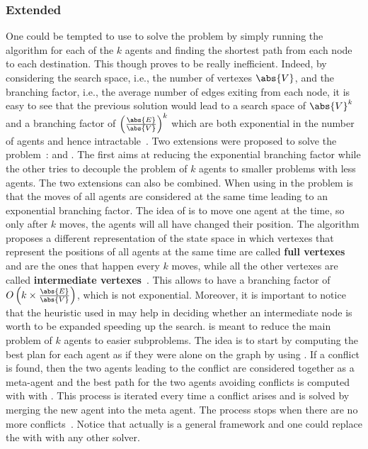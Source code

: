 \subsubsection{Extended \astar}
One could be tempted to use \astar to solve the  problem by simply
running the algorithm for each of the $k$ agents and finding the shortest path
from each node to each destination. This though proves to be really
inefficient. Indeed, by considering the search space, i.e., the number of
vertexes $\abs{V}$, and the branching factor, i.e., the average number of edges
exiting from each node, it is easy to see that the previous solution would lead
to a search space of $\abs{V}^k$ and a branching factor of
$\left(\frac{\abs{E}}{\abs{V}}\right)^k$ which are both exponential in the
number of agents and hence intractable~\cite{MAPF_overview}. \newline
Two extensions were proposed to solve the  problem~\cite{ODandID}: 
 and . The first aims at reducing the exponential branching
factor while the other tries to decouple the problem of $k$ agents to smaller
problems with less agents. The two extensions can also be combined. \newline
When using \astar in  the problem is that the moves of all agents
are considered at the same time leading to an exponential branching factor. The 
idea of  is to move one agent at the time, so only after $k$ moves, 
the agents will all have changed their position. The algorithm proposes a
different representation of the state space in which vertexes that represent
the positions of all agents at the same time are called \textbf{full vertexes}
and are the ones that happen every $k$ moves, while all the other vertexes are 
called \textbf{intermediate vertexes}~\cite{ODandID,MAPF_overview}. This
allows to have a branching factor of 
$O\left(k\times\frac{\abs{E}}{\abs{V}}\right)$, which is not exponential.
Moreover, it is important to notice that the heuristic used in \astar may help
in deciding whether an intermediate node is worth to be expanded speeding up
the search. \newline
{} is meant to reduce the main problem of $k$ agents to easier
subproblems. The idea is to start by computing the best plan for each agent as
if they were alone on the graph by using \astar. If a conflict is found, then
the two agents leading to the conflict are considered together as a meta-agent
and the best path for the two agents avoiding conflicts is computed with
\astar with . This process is iterated every time a conflict arises
and is solved by merging the new agent into the meta agent. The process stops
when there are no more conflicts~\cite{ODandID}. \newline
Notice that actually  is a general framework and one could replace the
\astar with  with any other  solver. 
%
